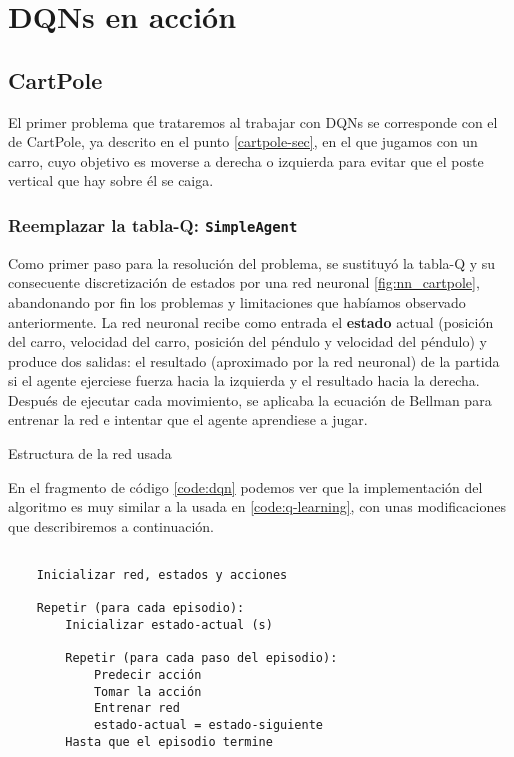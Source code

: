 \chapter{DQNs en acción}
\label{cap:dqnEnAccion}



\section{CartPole}
\label{sec:cartpoleDQN}

El primer problema que trataremos al trabajar con DQNs se corresponde con el de CartPole, ya descrito en el punto \ref{cartpole-sec}, en el que jugamos con un carro, cuyo objetivo es moverse a derecha o izquierda para evitar que el poste vertical que hay sobre él se caiga.


\subsection{Reemplazar la tabla-Q: \texttt{SimpleAgent}}

Como primer paso para la resolución del problema, se sustituyó la tabla-Q y su consecuente discretización de estados por una red neuronal \ref{fig:nn_cartpole}, abandonando por fin los problemas y limitaciones que habíamos observado anteriormente. La red neuronal recibe como entrada el \textbf{estado} actual (posición del carro, velocidad del carro, posición del péndulo y velocidad del péndulo) y produce dos salidas: el resultado (aproximado por la red neuronal) de la partida si el agente ejerciese fuerza hacia la izquierda y el resultado hacia la derecha. Después de ejecutar cada movimiento, se aplicaba la ecuación de Bellman para entrenar la red e intentar que el agente aprendiese a jugar.

%
       {Estructura de la red usada}

En el fragmento de código \ref{code:dqn} podemos ver que la implementación del algoritmo es muy similar a la usada en \ref{code:q-learning}, con unas modificaciones que describiremos a continuación.

\begin{minipage}{0.9\linewidth}%
    \begin{lstlisting}[frame=tb, caption=Pseudocódigo SimpleAgent, inputencoding=latin1, label=code:dqn]
    
    Inicializar red, estados y acciones
    
    Repetir (para cada episodio):
        Inicializar estado-actual (s)
        
        Repetir (para cada paso del episodio):
            Predecir acción
            Tomar la acción
            Entrenar red
            estado-actual = estado-siguiente
        Hasta que el episodio termine
    \end{lstlisting}%
\end{minipage}


